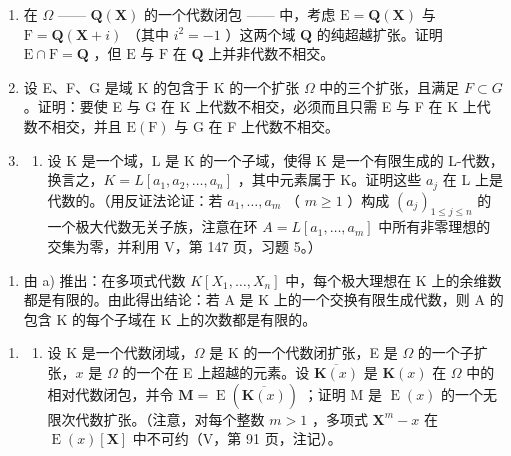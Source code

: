 \begin{enumerate}
\def\labelenumi{\arabic{enumi})}
\setcounter{enumi}{12}
\item
  在 \(\Omega\) —— \(\mathbf{Q}(\mathbf{X})\) 的一个代数闭包 —— 中，考虑 \(\mathrm{E} = \mathbf{Q}(\mathbf{X})\) 与 \(\mathrm{F} = \mathbf{Q}(\mathbf{X} + i)\) （其中 \(i^2 = -1\) ）这两个域 \(\mathbf{Q}\) 的纯超越扩张。证明 \(\mathrm{E} \cap \mathrm{F} = \mathbf{Q}\) ，但 \(\mathrm{E}\) 与 \(\mathrm{F}\) 在 \(\mathbf{Q}\) 上并非代数不相交。
\item
  设 E、F、G 是域 K 的包含于 K 的一个扩张 \(\Omega\) 中的三个扩张，且满足 \(F \subset G\) 。证明：要使 E 与 G 在 K 上代数不相交，必须而且只需 E 与 F 在 K 上代数不相交，并且 \(\mathrm{E}(\mathrm{F})\) 与 G 在 F 上代数不相交。
\item
  \begin{enumerate}
  \def\labelenumii{\alph{enumii})}
  \tightlist
  \item
    设 K 是一个域，L 是 K 的一个子域，使得 K 是一个有限生成的 L-代数，换言之，\(K = L[a_{1}, a_{2}, \ldots, a_{n}]\) ，其中元素属于 K。证明这些 \(a_{j}\) 在 L 上是代数的。（用反证法论证：若 \(a_{1}, \ldots, a_{m}\) （ \(m \geqslant 1\) ）构成 \((a_{j})_{1 \leqslant j \leqslant n}\) 的一个极大代数无关子族，注意在环 \(A = L[a_{1}, \ldots, a_{m}]\) 中所有非零理想的交集为零，并利用 V，第 147 页，习题 5。）
  \end{enumerate}
\end{enumerate}

\begin{enumerate}
\def\labelenumi{\alph{enumi})}
\setcounter{enumi}{1}
\tightlist
\item
  由 a) 推出：在多项式代数 \(K[X_{1}, \ldots, X_{n}]\) 中，每个极大理想在 K 上的余维数都是有限的。由此得出结论：若 A 是 K 上的一个交换有限生成代数，则 A 的包含 K 的每个子域在 K 上的次数都是有限的。
\end{enumerate}

\begin{enumerate}
\def\labelenumi{\arabic{enumi})}
\setcounter{enumi}{15}
\tightlist
\item
  \begin{enumerate}
  \def\labelenumii{\alph{enumii})}
  \tightlist
  \item
    设 K 是一个代数闭域，\(\Omega\) 是 K 的一个代数闭扩张，E 是 \(\Omega\) 的一个子扩张，\(x\) 是 \(\Omega\) 的一个在 E 上超越的元素。设 \(\overline{\mathbf{K}(x)}\) 是 \(\mathbf{K}(x)\) 在 \(\Omega\) 中的相对代数闭包，并令 \(\mathbf{M} = \operatorname{E}(\overline{\mathbf{K}(x)})\) ；证明 M 是 \(\operatorname{E}(x)\) 的一个无限次代数扩张。（注意，对每个整数 \(m > 1\) ，多项式 \(\mathbf{X}^m - x\) 在 \(\operatorname{E}(x)[\mathbf{X}]\) 中不可约（V，第 91 页，注记）。
  \end{enumerate}
\end{enumerate}

